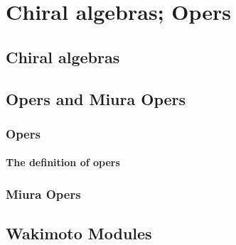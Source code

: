 \chapter{Chiral algebras; Opers}
    \begin{abstract}
        
    \end{abstract}
    
    \section{Chiral algebras}
    
    \section{Opers and Miura Opers}
        \subsection{Opers}
            \subsubsection{The definition of opers}
                \begin{definition}[Opers] \label{def: opers}
                    
                \end{definition}
        
        \subsection{Miura Opers}
    
    \section{Wakimoto Modules}